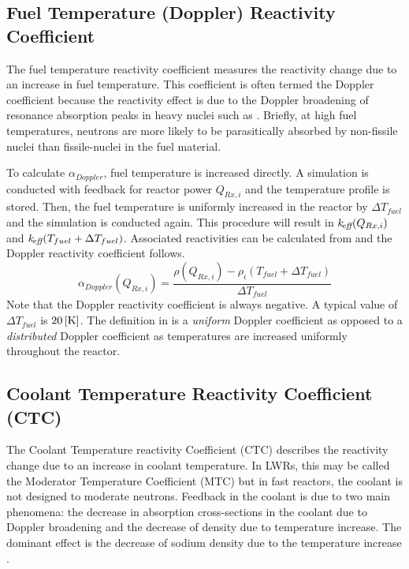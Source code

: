   \subsection{Fuel Temperature (Doppler) Reactivity Coefficient}
  \label{sec:fuel_temperature_reactivity_coefficient}
    The fuel temperature reactivity coefficient measures the reactivity change 
    due to an increase in fuel temperature. This coefficient is often termed the
    Doppler coefficient because the reactivity effect is due to the Doppler
    broadening of resonance absorption peaks in heavy nuclei such as
     \cite{textbookknief}. Briefly, at high fuel temperatures, 
    neutrons are more likely to be parasitically absorbed by non-fissile nuclei
    than fissile-nuclei in the fuel material.

    To calculate $\alpha_{Doppler}$, fuel temperature is increased directly. A
    simulation is conducted with feedback for reactor power $Q_{Rx,i}$ and the
    temperature profile is stored. Then, the fuel temperature is uniformly 
    increased in the reactor by $\Delta T_{fuel}$ and the simulation is
    conducted again. This procedure will result in $k_{\!\mbox{\scriptsize \em eff}}(Q_{Rx,i})$ and
    ${k_{\!\mbox{\scriptsize \em eff}}(T_{fuel} + \Delta T_{fuel})}$. Associated reactivities can be
    calculated from  and the Doppler reactivity coefficient
    follows.
    \begin{equation}
      \label{eq:doppler_reactivity_coefficient}
      \alpha_{Doppler}(Q_{Rx,i}) = \frac{\rho(Q_{Rx,i}) - \rho_i(T_{fuel} +
        \Delta T_{fuel})} {\Delta T_{fuel}}
    \end{equation}
    Note that the Doppler reactivity coefficient is always negative.
    A typical value of $\Delta T_{fuel}$ is $20\left[\text{{K}}\right]$.
    The definition in  is a
    \textit{uniform} Doppler coefficient as opposed to a \textit{distributed} 
    Doppler coefficient as temperatures are increased uniformly throughout the
    reactor.

  \subsection{Coolant Temperature Reactivity Coefficient (CTC)}
  \label{sec:coolant_temperature_reactivity_coefficient}
    The Coolant Temperature reactivity Coefficient (CTC) describes the
    reactivity change due to an increase in coolant temperature. In LWRs, this
    may be called the Moderator Temperature Coefficient (MTC) but in fast
    reactors, the coolant is not designed to moderate neutrons. Feedback in the 
    coolant is due to two main phenomena: the decrease in absorption 
    cross-sections in the coolant due to Doppler broadening and the decrease of 
    density due to temperature increase. The dominant effect is the decrease of 
    sodium density due to the temperature increase \cite{textbookknief}.

